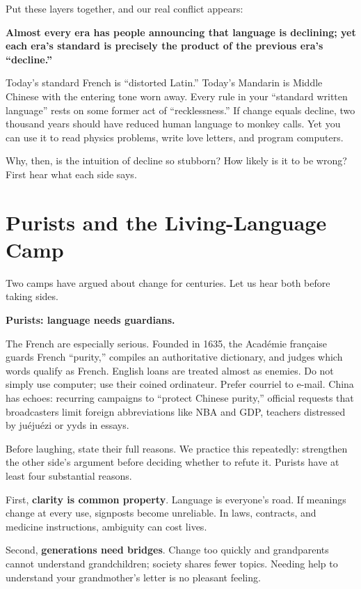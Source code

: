 Put these layers together, and our real conflict appears:

\textbf{Almost every era has people announcing that language is declining; yet each era's standard is precisely the product of the previous era's ``decline.''}

Today's standard French is ``distorted Latin.'' Today's Mandarin is Middle Chinese with the entering tone worn away. Every rule in your ``standard written language'' rests on some former act of ``recklessness.'' If change equals decline, two thousand years should have reduced human language to monkey calls. Yet you can use it to read physics problems, write love letters, and program computers.

Why, then, is the intuition of decline so stubborn? How likely is it to be wrong? First hear what each side says.

\section{Purists and the Living-Language Camp}
Two camps have argued about change for centuries. Let us hear both before taking sides.

\textbf{Purists: language needs guardians.}

The French are especially serious. Founded in 1635, the Académie française guards French ``purity,'' compiles an authoritative dictionary, and judges which words qualify as French. English loans are treated almost as enemies. Do not simply use computer; use their coined ordinateur. Prefer courriel to e-mail. China has echoes: recurring campaigns to ``protect Chinese purity,'' official requests that broadcasters limit foreign abbreviations like NBA and GDP, teachers distressed by juéjuézi or yyds in essays.

Before laughing, state their full reasons. We practice this repeatedly: strengthen the other side's argument before deciding whether to refute it. Purists have at least four substantial reasons.

First, \textbf{clarity is common property}. Language is everyone's road. If meanings change at every use, signposts become unreliable. In laws, contracts, and medicine instructions, ambiguity can cost lives.

Second, \textbf{generations need bridges}. Change too quickly and grandparents cannot understand grandchildren; society shares fewer topics. Needing help to understand your grandmother's letter is no pleasant feeling.


